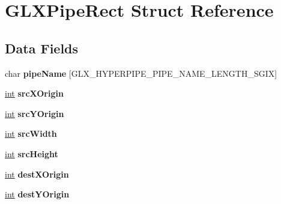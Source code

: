 \hypertarget{struct_g_l_x_pipe_rect}{}\section{G\+L\+X\+Pipe\+Rect Struct Reference}
\label{struct_g_l_x_pipe_rect}
\subsection*{Data Fields}
\begin{DoxyCompactItemize}
\item 
char {\bfseries pipe\+Name} \mbox{[}G\+L\+X\+\_\+\+H\+Y\+P\+E\+R\+P\+I\+P\+E\+\_\+\+P\+I\+P\+E\+\_\+\+N\+A\+M\+E\+\_\+\+L\+E\+N\+G\+T\+H\+\_\+\+S\+G\+IX\mbox{]}\hypertarget{struct_g_l_x_pipe_rect_accd4726a34638a32d105c6b9410837d3}{}\label{struct_g_l_x_pipe_rect_accd4726a34638a32d105c6b9410837d3}

\item 
\hyperlink{_s_d_l__thread_8h_a6a64f9be4433e4de6e2f2f548cf3c08e}{int} {\bfseries src\+X\+Origin}\hypertarget{struct_g_l_x_pipe_rect_a14a32d513a6133a3906071684545a9da}{}\label{struct_g_l_x_pipe_rect_a14a32d513a6133a3906071684545a9da}

\item 
\hyperlink{_s_d_l__thread_8h_a6a64f9be4433e4de6e2f2f548cf3c08e}{int} {\bfseries src\+Y\+Origin}\hypertarget{struct_g_l_x_pipe_rect_a7ed2930a1923ef08748e3b17fd5c8386}{}\label{struct_g_l_x_pipe_rect_a7ed2930a1923ef08748e3b17fd5c8386}

\item 
\hyperlink{_s_d_l__thread_8h_a6a64f9be4433e4de6e2f2f548cf3c08e}{int} {\bfseries src\+Width}\hypertarget{struct_g_l_x_pipe_rect_a4870d9a36c1807f11cb979aa80fddfe7}{}\label{struct_g_l_x_pipe_rect_a4870d9a36c1807f11cb979aa80fddfe7}

\item 
\hyperlink{_s_d_l__thread_8h_a6a64f9be4433e4de6e2f2f548cf3c08e}{int} {\bfseries src\+Height}\hypertarget{struct_g_l_x_pipe_rect_a7e7fdf395cb1b3138cc609c3f1a79cab}{}\label{struct_g_l_x_pipe_rect_a7e7fdf395cb1b3138cc609c3f1a79cab}

\item 
\hyperlink{_s_d_l__thread_8h_a6a64f9be4433e4de6e2f2f548cf3c08e}{int} {\bfseries dest\+X\+Origin}\hypertarget{struct_g_l_x_pipe_rect_a65a8b40e77f09ba5df88b110f1fe90be}{}\label{struct_g_l_x_pipe_rect_a65a8b40e77f09ba5df88b110f1fe90be}

\item 
\hyperlink{_s_d_l__thread_8h_a6a64f9be4433e4de6e2f2f548cf3c08e}{int} {\bfseries dest\+Y\+Origin}\hypertarget{struct_g_l_x_pipe_rect_ad33b54181f1656ad33d574ee653ef8e2}{}\label{struct_g_l_x_pipe_rect_ad33b54181f1656ad33d574ee653ef8e2}


\end{DoxyCompactItemize}
